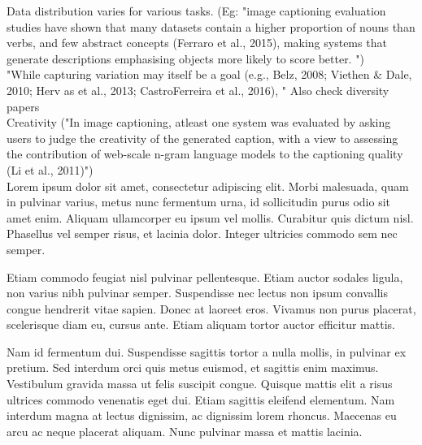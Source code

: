 Data distribution varies for various tasks. (Eg: "image captioning evaluation studies have shown that many datasets  contain  a  higher  proportion  of  nouns  than  verbs,  and  few  abstract concepts (Ferraro et al., 2015), making systems that generate descriptions emphasising objects more likely to score better. ")
\\
"While  capturing  variation  may  itself be a goal (e.g., Belz, 2008; Viethen \& Dale, 2010; Herv as et al., 2013; CastroFerreira  et  al.,  2016),  " Also check diversity papers\\
Creativity ("In image captioning,  atleast one system was evaluated by asking users to judge the creativity of the generated  caption,  with  a  view  to  assessing  the  contribution  of  web-scale  n-gram  language  models  to  the  captioning  quality  (Li  et  al.,  2011)")\\
Lorem ipsum dolor sit amet, consectetur adipiscing elit. Morbi
malesuada, quam in pulvinar varius, metus nunc fermentum urna, id
sollicitudin purus odio sit amet enim. Aliquam ullamcorper eu ipsum
vel mollis. Curabitur quis dictum nisl. Phasellus vel semper risus, et
lacinia dolor. Integer ultricies commodo sem nec semper.

Etiam commodo feugiat nisl pulvinar pellentesque. Etiam auctor sodales
ligula, non varius nibh pulvinar semper. Suspendisse nec lectus non
ipsum convallis congue hendrerit vitae sapien. Donec at laoreet
eros. Vivamus non purus placerat, scelerisque diam eu, cursus
ante. Etiam aliquam tortor auctor efficitur mattis.

Nam id fermentum dui. Suspendisse sagittis tortor a nulla mollis, in
pulvinar ex pretium. Sed interdum orci quis metus euismod, et sagittis
enim maximus. Vestibulum gravida massa ut felis suscipit
congue. Quisque mattis elit a risus ultrices commodo venenatis eget
dui. Etiam sagittis eleifend elementum.
Nam interdum magna at lectus dignissim, ac dignissim lorem
rhoncus. Maecenas eu arcu ac neque placerat aliquam. Nunc pulvinar
massa et mattis lacinia.
\fi 

\endinput